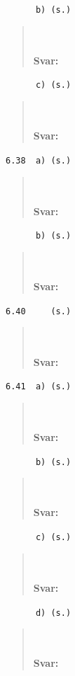 \documentclass[a4paper]{article}
\newcommand{\tskcol}[1]{\textcolor{tskcol}{#1}}
\begin{document}
	\texttt{\tskcol{~~~~~~b) (s.)}}
	\begin{quotation}
		\noindent
		\\ \\
		\textbf{Svar:}
	\end{quotation}
	
	\texttt{\tskcol{~~~~~~c) (s.)}}
	\begin{quotation}
		\noindent
		\\ \\
		\textbf{Svar:}
	\end{quotation}
	
	\texttt{\tskcol{6.38~~a) (s.)}}
	\begin{quotation}
		\noindent
		\\ \\
		\textbf{Svar:}
	\end{quotation}
	
	\texttt{\tskcol{~~~~~~b) (s.)}}
	\begin{quotation}
		\noindent
		\\ \\
		\textbf{Svar:}
	\end{quotation}
	
	\texttt{\tskcol{6.40~~~~ (s.)}}
	\begin{quotation}
		\noindent
		\\ \\
		\textbf{Svar:}
	\end{quotation}
	
	\texttt{\tskcol{6.41~~a) (s.)}}
	\begin{quotation}
		\noindent
		\\ \\
		\textbf{Svar:}
	\end{quotation}
	
	\texttt{\tskcol{~~~~~~b) (s.)}}
	\begin{quotation}
		\noindent
		\\ \\
		\textbf{Svar:}
	\end{quotation}
	
	\texttt{\tskcol{~~~~~~c) (s.)}}
	\begin{quotation}
		\noindent
		\\ \\
		\textbf{Svar:}
	\end{quotation}
	
	\texttt{\tskcol{~~~~~~d) (s.)}}
	\begin{quotation}
		\noindent
		\\ \\
		\textbf{Svar:}
	\end{quotation}
	
\end{document}
